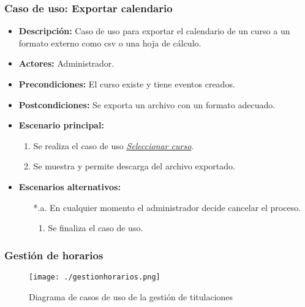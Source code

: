 \subsubsection*{Caso de uso: Exportar calendario}
\begin{itemize}
\item{\bf Descripción:} Caso de uso para exportar el calendario de un curso a un formato externo como csv o una hoja de cálculo.
\item{\bf Actores:} Administrador.
\item{\bf Precondiciones:} El curso existe y tiene eventos creados.
\item{\bf Postcondiciones:} Se exporta un archivo con un formato adecuado.
\item{\bf Escenario principal:}
	\begin{enumerate}
	\item Se realiza el caso de uso {\em \hyperref[select_curso]{Seleccionar curso}}.
	\item Se muestra y permite descarga del archivo exportado.
	\end{enumerate}
\item{\bf Escenarios alternativos:}
	\begin{itemize}
		\item[*.a.] En cualquier momento el administrador decide cancelar el proceso.
		\begin{enumerate}
			\item Se finaliza el caso de uso.
		\end{enumerate}
	\end{itemize}
\end{itemize}


\subsubsection{Gestión de horarios}
\begin{figure}[H] 
  \label{gestion-horarios} 
	\begin{center}
    \texttt{[image: ./gestionhorarios.png]}
  \end{center}
\caption{Diagrama de casos de uso de la gestión de titulaciones}
\end{figure}

